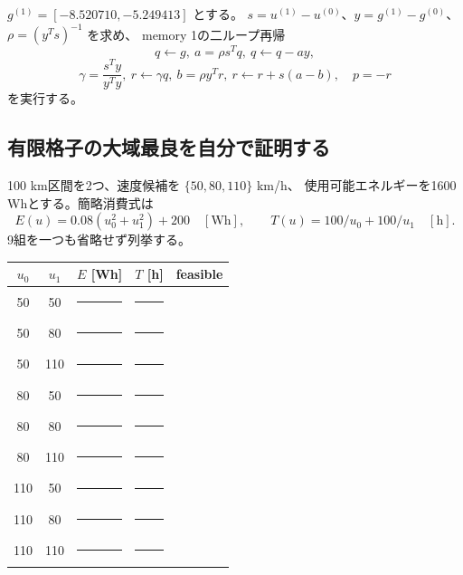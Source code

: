 
$g^{(1)}=[-8.520710,-5.249413]$ とする。
$s=u^{(1)}-u^{(0)}$、$y=g^{(1)}-g^{(0)}$、$\rho=(y^Ts)^{-1}$ を求め、
memory 1の二ループ再帰
\[
q\leftarrow g,\ a=\rho s^Tq,\ q\leftarrow q-ay,
\]
\[
\gamma=\frac{s^Ty}{y^Ty},\ r\leftarrow\gamma q,
\ b=\rho y^Tr,\ r\leftarrow r+s(a-b),\quad p=-r
\]
を実行する。


\subsection{有限格子の大域最良を自分で証明する}
100 km区間を2つ、速度候補を $\{50,80,110\}$ km/h、
使用可能エネルギーを1600 Whとする。簡略消費式は
\[
E(u)=0.08(u_0^2+u_1^2)+200\quad[\mathrm{Wh}],
\qquad T(u)=100/u_0+100/u_1\quad[\mathrm{h}].
\]
9組を一つも省略せず列挙する。
\begin{center}\small
\begin{tabular}{ccrrc}
\toprule
$u_0$&$u_1$&$E$ [Wh]&$T$ [h]&feasible\\\midrule
50&50&\rule{15mm}{0.4pt}&\rule{15mm}{0.4pt}&\\
50&80&\rule{15mm}{0.4pt}&\rule{15mm}{0.4pt}&\\
50&110&\rule{15mm}{0.4pt}&\rule{15mm}{0.4pt}&\\
80&50&\rule{15mm}{0.4pt}&\rule{15mm}{0.4pt}&\\
80&80&\rule{15mm}{0.4pt}&\rule{15mm}{0.4pt}&\\
80&110&\rule{15mm}{0.4pt}&\rule{15mm}{0.4pt}&\\
110&50&\rule{15mm}{0.4pt}&\rule{15mm}{0.4pt}&\\
110&80&\rule{15mm}{0.4pt}&\rule{15mm}{0.4pt}&\\
110&110&\rule{15mm}{0.4pt}&\rule{15mm}{0.4pt}&\\
\bottomrule
\end{tabular}
\end{center}


